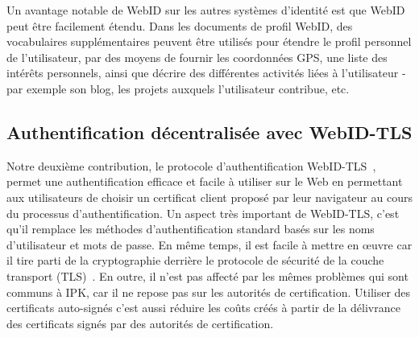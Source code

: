 Un avantage notable de WebID sur les autres systèmes d'identité est que WebID peut être facilement étendu. Dans les documents de profil WebID, des vocabulaires supplémentaires peuvent être utilisés pour étendre le profil personnel de l'utilisateur, par des moyens de fournir les coordonnées GPS, une liste des intérêts personnels, ainsi que décrire des différentes activités liées à l'utilisateur - par exemple son blog, les projets auxquels l'utilisateur contribue, etc.

\subsection*{Authentification décentralisée avec WebID-TLS}
Notre deuxième contribution, le protocole d'authentification WebID-TLS~\cite{webid-tls}, permet une authentification efficace et facile à utiliser sur le Web en permettant aux utilisateurs de choisir un certificat client proposé par leur navigateur au cours du processus d'authentification. Un aspect très important de WebID-TLS, c'est qu'il remplace les méthodes d'authentification standard basés sur les noms d'utilisateur et mots de passe. En même temps, il est facile à mettre en œuvre car il tire parti de la cryptographie derrière le protocole de sécurité de la couche transport (TLS)~\cite{dierks2008transport}. En outre, il n'est pas affecté par les mêmes problèmes qui sont communs à IPK, car il ne repose pas sur les autorités de certification. Utiliser des certificats auto-signés c'est aussi réduire les coûts créés à partir de la délivrance des certificats signés par des autorités de certification.\\


